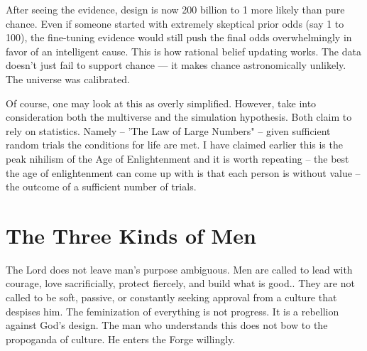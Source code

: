 \documentclass[12pt,a4paper]{book}
\begin{document}
After seeing the evidence,  design is now 200 billion to 1 more likely than pure chance.
Even if someone started with extremely skeptical prior odds (say 1 to 100), the fine-tuning evidence would still push the final odds overwhelmingly in favor of an intelligent cause.  This is how rational belief updating works. The data doesn’t just fail to support chance — it makes chance astronomically unlikely.  The universe was calibrated.

Of course, one may look at this as overly simplified.  However, take into consideration both the multiverse and the simulation hypothesis.  Both claim to rely on statistics.  Namely -- 'The Law of Large Numbers" -- given sufficient random trials the conditions for life are met.  I have claimed earlier this is the peak nihilism of the Age of Enlightenment and it is worth repeating -- the best the age of enlightenment can come up with is that each person is without value -- the outcome of a sufficient number of trials.

\section{The Three Kinds of Men}
The Lord does not leave man’s purpose ambiguous.   Men are called to lead with courage, love sacrificially, protect fiercely, and build what is good..  They are not called to be soft, passive, or constantly seeking approval from a culture that despises him.  The feminization of everything is not progress. It is a rebellion against God’s design.  The man who understands this does not bow to the propoganda of culture.  He enters the Forge willingly. 
\end{document}

